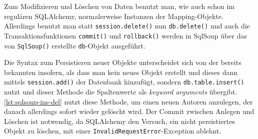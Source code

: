 

Zum Modifizieren und Löschen von Daten benutzt man, wie auch schon im regulären
SQLAlchemy, normalerweise Instanzen der Mapping-Objekte. Allerdings benutzt man
statt \texttt{session.delete()} nun \texttt{db.delete()} und auch die
Transaktionsfunktionen \texttt{commit()} und \texttt{rollback()} werden in
SqlSoup über das von \texttt{SqlSoup()} erstellte \texttt{db}-Objekt ausgeführt.

Die Syntax zum Persistieren neuer Objekte unterscheidet sich von der bereits
bekannten insofern, als dass man kein neues Objekt erstellt und dieses dann mittels
\texttt{session.add()} der Datenbank hinzufügt, sondern
\texttt{db.table.insert()} nutzt und dieser Methode die Spaltenwerte als
\textit{keyword arguments} übergibt. \autoref{lst:sqlsoup-ins-del} nutzt diese
Methode, um einen neuen Autoren anzulegen, der danach allerdings sofort wieder
gelöscht wird. Der Commit zwischen Anlegen und Löschen ist notwendig, da
SQLAlchemy den Versuch, ein nicht persistiertes Objekt zu löschen, mit einer
\texttt{InvalidRequestError}-Exception ablehnt.


